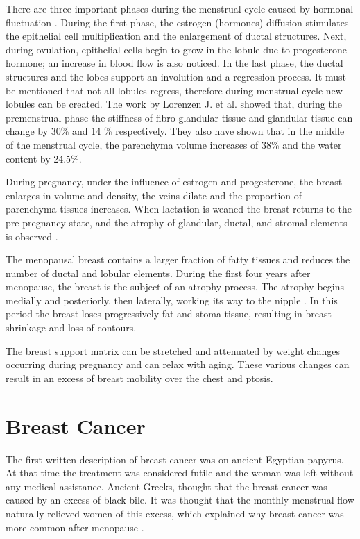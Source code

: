 There are three important phases during the menstrual cycle caused by hormonal fluctuation \citep{andolina2011mammographic}. During the first phase, the estrogen (hormones) diffusion stimulates the epithelial cell multiplication and the enlargement of ductal structures. Next, during ovulation, epithelial cells begin to grow in the lobule due to progesterone hormone; an increase in blood flow is also noticed. In the last phase, the ductal structures and the lobes support an involution and a regression process. It must be mentioned that not all lobules regress, therefore during menstrual cycle new lobules can be created.   The work by Lorenzen J. et al. \citep{lorenzen_menstrual-cycle_2003} showed that, during the premenstrual phase the stiffness of fibro-glandular tissue and glandular tissue can change by 30\% and 14 \% respectively. They also have shown that in the middle of the menstrual cycle, the parenchyma volume increases of 38\% and the water content by 24.5\%.

During pregnancy, under the influence of estrogen and progesterone, the breast enlarges in volume and density, the veins dilate and the proportion of parenchyma tissues increases.  When lactation is weaned the breast returns to the pre-pregnancy state, and the atrophy of glandular, ductal, and stromal elements  is observed \citep{pandya_breast_2011}.

The menopausal breast contains a larger fraction of fatty tissues and reduces the number of ductal and lobular elements. During the first four years after menopause, the breast is the subject of an atrophy process. The atrophy begins medially and posteriorly, then laterally, working its way to the nipple \citep{andolina2011mammographic}. In this period the breast loses progressively fat and stoma tissue, resulting in breast shrinkage and loss of contours.

 The breast support matrix can be stretched and attenuated by weight changes occurring during pregnancy and can relax with aging. These various changes can result in an excess of breast mobility over the chest and ptosis. 

\section{Breast Cancer}\label{section:breastcancer}

The first written description of breast cancer was on ancient Egyptian papyrus. At that time the treatment was considered futile and the woman was left without any medical assistance. Ancient Greeks, thought that the breast cancer was caused by an excess of black bile. It was thought that the monthly menstrual flow naturally relieved women of this excess, which explained why breast cancer was more common after menopause \citep{andolina2011mammographic}.

